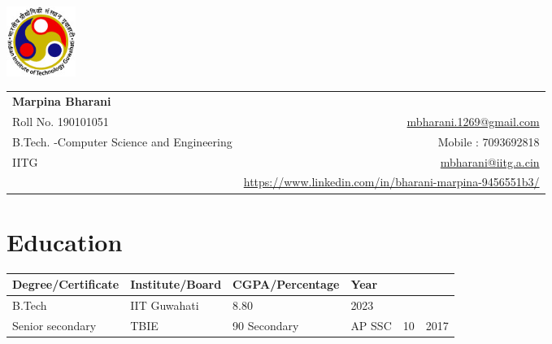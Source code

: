 \documentclass[a4paper,10pt]{report}
\begin{document}
\vspace{-0.1000pt}


\parbox{2.35cm}{

\includegraphics[width=2.25cm,clip]{iitg_logo.jpg}

}
\parbox{\dimexpr\linewidth-2.5cm\relax}{

\begin{tabular*}{\textwidth}{l@{\hskip 1.5cm}r}


\textbf{\huge Marpina Bharani}\\
{Roll No. 190101051}&\href{mailto:mbharani.1269@gmail.com}{ mbharani.1269@gmail.com}\\
{B.Tech. -Computer Science and Engineering}& Mobile : 7093692818\\
{IITG}&\href{mailto:mbharani@iitg.a.cin}{ mbharani@iitg.a.cin}\\
{} & \href{https://www.https://www.linkedin.com/in/bharani-marpina-9456551b3//}{https://www.linkedin.com/in/bharani-marpina-9456551b3/}

\end{tabular*}
}


\vspace{5pt}


\section{Education}
\centering
 \begin{tabu} to 1\textwidth { | X[c] | X[c] | X[c] | X[c]| }
 \hline   \textbf{Degree/Certificate} & \textbf{Institute/Board} & \textbf{CGPA/Percentage} & \textbf{Year} \\
 
\hline B.Tech& IIT Guwahati& 8.80& 2023\\
\hline Senior secondary& TBIE& 90%
\hline Secondary& AP SSC& 10& 2017\\

\hline
\end{tabu}
\end{document}
